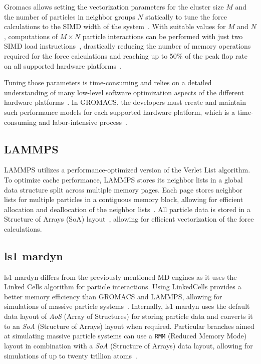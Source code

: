 \documentclass[conference]{IEEEtran}
\begin{document}
Gromacs allows setting the vectorization parameters for the cluster size $M$ and the number of particles in neighbor groups $N$ statically to tune the force calculations to the SIMD width of the system~\cite{PALL20132641}. With suitable values for $M$ and $N$, computations of $M \times N$ particle interactions can be performed with just two SIMD load instructions~\cite{Solving_Software_Challenges_Exascale_2014}, drastically reducing the number of memory operations required for the force calculations and reaching up to 50\% of the peak flop rate on all supported hardware platforms~\cite{Solving_Software_Challenges_Exascale_2014}.

Tuning those parameters is time-consuming and relies on a detailed understanding of many low-level software optimization aspects of the different hardware platforms~\cite{PALL20132641}. In GROMACS, the developers must create and maintain such performance models for each supported hardware platform, which is a time-consuming and labor-intensive process~\cite{PALL20132641}.

\subsection{LAMMPS}

LAMMPS utilizes a performance-optimized version of the Verlet List algorithm. To optimize cache performance, LAMMPS stores its neighbor lists in a global data structure split across multiple memory pages. Each page stores neighbor lists for multiple particles in a contiguous memory block, allowing for efficient allocation and deallocation of the neighbor lists~\cite{THOMPSON2022108171}. All particle data is stored in a Structure of Arrays (SoA) layout~\cite{THOMPSON2022108171}, allowing for efficient vectorization of the force calculations.

\subsection{ls1 mardyn}

ls1 mardyn differs from the previously mentioned MD engines as it uses the Linked Cells algorithm for particle interactions. Using LinkedCells provides a better memory efficiency than GROMACS and LAMMPS, allowing for simulations of massive particle systems~\cite{tchipev2019twe}. Internally, ls1 mardyn uses the default data layout of \textit{AoS} (Array of Structures) for storing particle data and converts it to an \textit{SoA} (Structure of Arrays) layout when required. Particular branches aimed at simulating massive particle systems can use a \texttt{RMM} (Reduced Memory Mode) layout in combination with a \textit{SoA} (Structure of Arrays) data layout, allowing for simulations of up to twenty trillion atoms~\cite{tchipev2019twe}.
\end{document}
